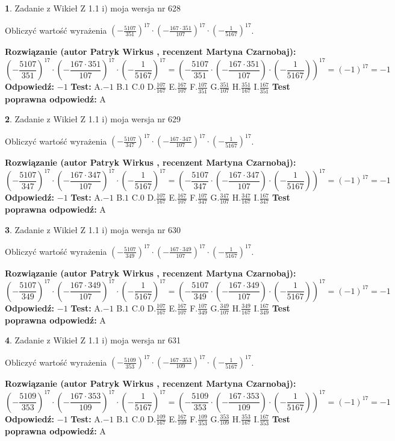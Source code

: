 \documentclass[12pt, a4paper]{article}
\theoremstyle{definition} %
\newtheorem{zad}{}
\newcommand{\zadStart}[1]{\begin{zad}#1\newline}
\newcommand{\zadStop}{\end{zad}}
\newcommand{\rozwStart}[2]{\noindent \textbf{Rozwiązanie (autor #1 , recenzent #2): }\newline}
\newcommand{\rozwStop}{\newline}
\newcommand{\odpStart}{\noindent \textbf{Odpowiedź:}\newline}
\newcommand{\odpStop}{\newline}
\newcommand{\testStart}{\noindent \textbf{Test:}\newline}
\newcommand{\testStop}{\newline}
\newcommand{\kluczStart}{\noindent \textbf{Test poprawna odpowiedź:}\newline}
\newcommand{\kluczStop}{\newline}
\begin{document}
\zadStart{Zadanie z Wikieł Z 1.1 i) moja wersja nr 628}

Obliczyć wartość wyrażenia $(-\frac{5107}{351})^{17} \cdot (-\frac{167 \cdot 351}{107})^{17} \cdot (-\frac{1}{5167})^{17}$.
\zadStop
\rozwStart{Patryk Wirkus}{Martyna Czarnobaj}
$$(-\frac{5107}{351})^{17} \cdot (-\frac{167 \cdot 351}{107})^{17} \cdot (-\frac{1}{5167})^{17} = (-\frac{5107}{351} \cdot (-\frac{167 \cdot 351}{107}) \cdot (-\frac{1}{5167}))^{17} = (-1)^{17} = -1$$
\rozwStop
\odpStart
$-1$
\odpStop
\testStart
A.$-1$ B.$1$ C.$0$ D.$\frac{107}{167}$ E.$\frac{167}{107}$
F.$\frac{107}{351}$ G.$\frac{351}{107}$
H.$\frac{351}{167}$
I.$\frac{167}{351}$
\testStop
\kluczStart
A
\kluczStop



\zadStart{Zadanie z Wikieł Z 1.1 i) moja wersja nr 629}

Obliczyć wartość wyrażenia $(-\frac{5107}{347})^{17} \cdot (-\frac{167 \cdot 347}{107})^{17} \cdot (-\frac{1}{5167})^{17}$.
\zadStop
\rozwStart{Patryk Wirkus}{Martyna Czarnobaj}
$$(-\frac{5107}{347})^{17} \cdot (-\frac{167 \cdot 347}{107})^{17} \cdot (-\frac{1}{5167})^{17} = (-\frac{5107}{347} \cdot (-\frac{167 \cdot 347}{107}) \cdot (-\frac{1}{5167}))^{17} = (-1)^{17} = -1$$
\rozwStop
\odpStart
$-1$
\odpStop
\testStart
A.$-1$ B.$1$ C.$0$ D.$\frac{107}{167}$ E.$\frac{167}{107}$
F.$\frac{107}{347}$ G.$\frac{347}{107}$
H.$\frac{347}{167}$
I.$\frac{167}{347}$
\testStop
\kluczStart
A
\kluczStop



\zadStart{Zadanie z Wikieł Z 1.1 i) moja wersja nr 630}

Obliczyć wartość wyrażenia $(-\frac{5107}{349})^{17} \cdot (-\frac{167 \cdot 349}{107})^{17} \cdot (-\frac{1}{5167})^{17}$.
\zadStop
\rozwStart{Patryk Wirkus}{Martyna Czarnobaj}
$$(-\frac{5107}{349})^{17} \cdot (-\frac{167 \cdot 349}{107})^{17} \cdot (-\frac{1}{5167})^{17} = (-\frac{5107}{349} \cdot (-\frac{167 \cdot 349}{107}) \cdot (-\frac{1}{5167}))^{17} = (-1)^{17} = -1$$
\rozwStop
\odpStart
$-1$
\odpStop
\testStart
A.$-1$ B.$1$ C.$0$ D.$\frac{107}{167}$ E.$\frac{167}{107}$
F.$\frac{107}{349}$ G.$\frac{349}{107}$
H.$\frac{349}{167}$
I.$\frac{167}{349}$
\testStop
\kluczStart
A
\kluczStop



\zadStart{Zadanie z Wikieł Z 1.1 i) moja wersja nr 631}

Obliczyć wartość wyrażenia $(-\frac{5109}{353})^{17} \cdot (-\frac{167 \cdot 353}{109})^{17} \cdot (-\frac{1}{5167})^{17}$.
\zadStop
\rozwStart{Patryk Wirkus}{Martyna Czarnobaj}
$$(-\frac{5109}{353})^{17} \cdot (-\frac{167 \cdot 353}{109})^{17} \cdot (-\frac{1}{5167})^{17} = (-\frac{5109}{353} \cdot (-\frac{167 \cdot 353}{109}) \cdot (-\frac{1}{5167}))^{17} = (-1)^{17} = -1$$
\rozwStop
\odpStart
$-1$
\odpStop
\testStart
A.$-1$ B.$1$ C.$0$ D.$\frac{109}{167}$ E.$\frac{167}{109}$
F.$\frac{109}{353}$ G.$\frac{353}{109}$
H.$\frac{353}{167}$
I.$\frac{167}{353}$
\testStop
\kluczStart
A
\kluczStop
\end{document}
